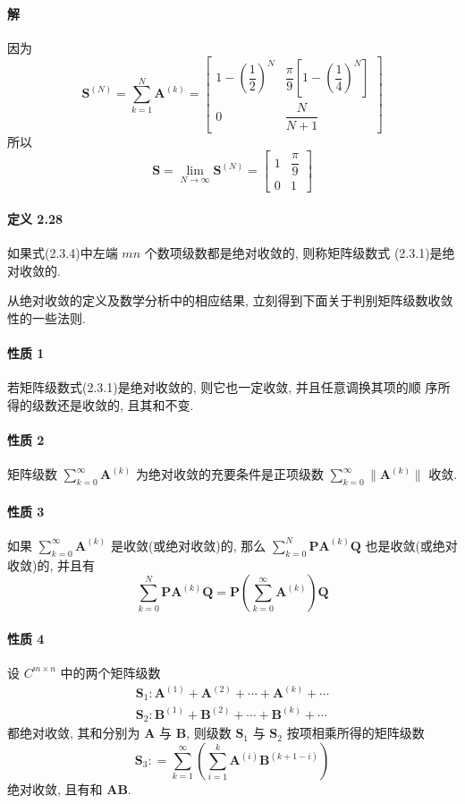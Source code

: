 \paragraph*{解} 因为
$$
    \bm{S}^{(N)} = \sum\limits_{k=1}^N \bm{A}^{(k)} = \begin{bmatrix}
        1 - (\dfrac{1}{2})^N & \dfrac{\pi}{9}[1 - (\dfrac{1}{4})^N] \\
        0                    & \dfrac{N}{N + 1}
    \end{bmatrix}
$$
所以
$$
    \bm{S} = \lim\limits_{N \to \infty} \bm{S}^{(N)} = \begin{bmatrix}
        1 & \dfrac{\pi}{9} \\
        0 & 1
    \end{bmatrix}
$$

\paragraph*{定义 2.28} 如果式(2.3.4)中左端 $mn$ 个数项级数都是绝对收敛的, 则称矩阵级数式
(2.3.1)是绝对收敛的.

\par 从绝对收敛的定义及数学分析中的相应结果, 立刻得到下面关于判别矩阵级数收敛
性的一些法则.

\paragraph*{性质 1} 若矩阵级数式(2.3.1)是绝对收敛的, 则它也一定收敛, 并且任意调换其项的顺
序所得的级数还是收敛的, 且其和不变.

\paragraph*{性质 2} 矩阵级数 $\sum\limits_{k=0}^\infty \bm{A}^{(k)}$ 为绝对收敛的充要条件是正项级数 $\sum\limits_{k=0}^\infty \lVert \bm{A}^{(k)} \rVert$ 收敛.

\paragraph*{性质 3} 如果 $\sum\limits_{k=0}^\infty \bm{A}^{(k)}$ 是收敛(或绝对收敛)的, 那么 $\sum\limits_{k=0}^{N} \bm{PA}^{(k)}\bm{Q}$ 也是收敛(或绝对收敛)的, 并且有
$$
    \sum\limits_{k=0}^{N} \bm{PA}^{(k)}\bm{Q} = \bm{P}(\sum\limits_{k=0}^\infty \bm{A}^{(k)}) \bm{Q}
$$

\paragraph*{性质 4} 设 $C^{m\times n}$ 中的两个矩阵级数
\begin{gather*}
    \bm{S}_1: \bm{A}^{(1)} + \bm{A}^{(2)} + \cdots + \bm{A}^{(k)} + \cdots \\
    \bm{S}_2: \bm{B}^{(1)} + \bm{B}^{(2)} + \cdots + \bm{B}^{(k)} + \cdots
\end{gather*}
都绝对收敛, 其和分别为 $\bm{A}$ 与 $\bm{B}$, 则级数 $\bm{S}_1$ 与 $\bm{S}_2$ 按项相乘所得的矩阵级数
$$
    \bm{S}_3: = \sum\limits_{k=1}^\infty (\sum\limits_{i=1}^k \bm{A}^{(i)}\bm{B}^{(k + 1 - i)})
$$
绝对收敛, 且有和 $\bm{AB}$.


